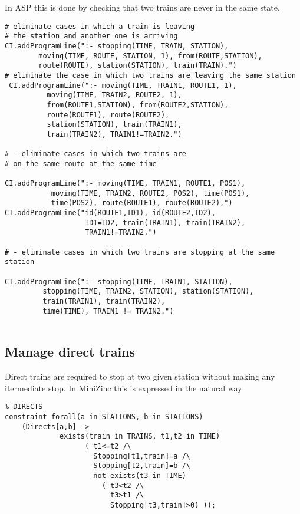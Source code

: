 \documentclass[11pt]{article}
\begin{document}
In ASP this is done by checking that two trains are never in the same state.

\begin{verbatim}
# eliminate cases in which a train is leaving 
# the station and another one is arriving 
CI.addProgramLine(":- stopping(TIME, TRAIN, STATION), 
        moving(TIME, ROUTE, STATION, 1), from(ROUTE,STATION),
        route(ROUTE), station(STATION), train(TRAIN).")
# eliminate the case in which two trains are leaving the same station
 CI.addProgramLine(":- moving(TIME, TRAIN1, ROUTE1, 1),
          moving(TIME, TRAIN2, ROUTE2, 1), 
          from(ROUTE1,STATION), from(ROUTE2,STATION),
          route(ROUTE1), route(ROUTE2),
          station(STATION), train(TRAIN1),
          train(TRAIN2), TRAIN1!=TRAIN2.")
        
# - eliminate cases in which two trains are 
# on the same route at the same time

CI.addProgramLine(":- moving(TIME, TRAIN1, ROUTE1, POS1),
           moving(TIME, TRAIN2, ROUTE2, POS2), time(POS1),
           time(POS2), route(ROUTE1), route(ROUTE2),")
CI.addProgramLine("id(ROUTE1,ID1), id(ROUTE2,ID2),
                   ID1=ID2, train(TRAIN1), train(TRAIN2),
                   TRAIN1!=TRAIN2.")

# - eliminate cases in which two trains are stopping at the same station

CI.addProgramLine(":- stopping(TIME, TRAIN1, STATION),
         stopping(TIME, TRAIN2, STATION), station(STATION),
         train(TRAIN1), train(TRAIN2), 
         time(TIME), TRAIN1 != TRAIN2.")
    
\end{verbatim}

\subsection{Manage direct trains}

Direct trains are required to stop at two given station without
making any itermediate stop. In MiniZinc this is expressed in the natural way:

\begin{verbatim}
% DIRECTS
constraint forall(a in STATIONS, b in STATIONS)
    (Directs[a,b] -> 
             exists(train in TRAINS, t1,t2 in TIME)
                   ( t1<=t2 /\ 
                     Stopping[t1,train]=a /\
                     Stopping[t2,train]=b /\
                     not exists(t3 in TIME)
                       ( t3<t2 /\ 
                         t3>t1 /\ 
                         Stopping[t3,train]>0) ));
\end{verbatim}
\end{document}
